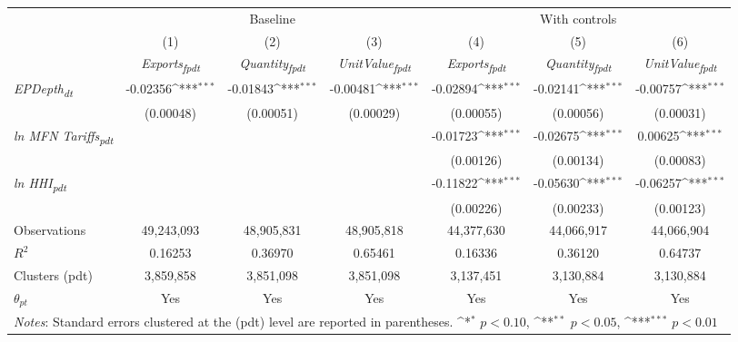 {
\def\sym#1{\ifmmode^{#1}\else\(^{#1}\)\fi}
\begin{tabular}{l*{6}{c}}
\toprule
&\multicolumn{3}{c}{Baseline}&\multicolumn{3}{c}{With controls}\\\cmidrule(lr){2-4}\cmidrule(lr){5-7}
&(1)&(2)&(3)&(4)&(5)&(6)\\
&\textit{Exports\textsubscript{fpdt}}&\textit{Quantity\textsubscript{fpdt}}&\textit{UnitValue\textsubscript{fpdt}}&\textit{Exports\textsubscript{fpdt}}&\textit{Quantity\textsubscript{fpdt}}&\textit{UnitValue\textsubscript{fpdt}}\\
\midrule
\textit{EPDepth\textsubscript{dt}} & -0.02356\sym{***} & -0.01843\sym{***} & -0.00481\sym{***} & -0.02894\sym{***} & -0.02141\sym{***} & -0.00757\sym{***}\\
 & (0.00048) & (0.00051) & (0.00029) & (0.00055) & (0.00056) & (0.00031)\\
\addlinespace
\textit{ln MFN Tariffs\textsubscript{pdt}} &  &  &  & -0.01723\sym{***} & -0.02675\sym{***} & 0.00625\sym{***}\\
 &  &  &  & (0.00126) & (0.00134) & (0.00083)\\
\addlinespace
\textit{ln HHI\textsubscript{pdt}} &  &  &  & -0.11822\sym{***} & -0.05630\sym{***} & -0.06257\sym{***}\\
 &  &  &  & (0.00226) & (0.00233) & (0.00123)\\
\midrule
Observations & 49,243,093 & 48,905,831 & 48,905,818 & 44,377,630 & 44,066,917 & 44,066,904\\
$R^{2}$ & 0.16253 & 0.36970 & 0.65461 & 0.16336 & 0.36120 & 0.64737\\
Clusters (pdt) & 3,859,858 & 3,851,098 & 3,851,098 & 3,137,451 & 3,130,884 & 3,130,884\\
$\theta_{pt}$ & Yes & Yes & Yes & Yes & Yes & Yes\\
\bottomrule
\multicolumn{7}{l}{\footnotesize \textit{Notes}: Standard errors clustered at the (pdt) level are reported in parentheses. \sym{*} \(p<0.10\), \sym{**} \(p<0.05\), \sym{***} \(p<0.01\)}\\
\end{tabular}
}
